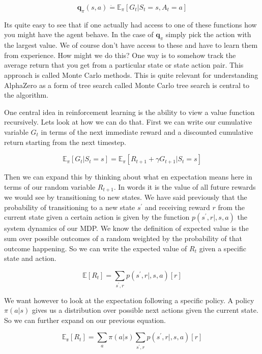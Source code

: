 \begin{equation}\label{Expected State Action Value}
\mathbf{q}_{\pi}(s,a) \dot{=} \mathbb{E}_{\pi}[G_{t} | S_{t} = s, A_{t} = a] 
\end{equation}

Its quite easy to see that if one actually had access to one of these functions how you might have the agent behave. In the case of $\mathbf{q}_{\pi}$ simply pick the action with the largest value. We of course don't have access to these and have to learn them from experience. How might we do this? One way is to somehow track the average return that you get from a particular state or state action pair. This approach is called Monte Carlo methods. This is quite relevant for understanding AlphaZero as a form of tree search called Monte Carlo tree search is central to the algorithm. 
    
One central idea in reinforcement learning is the ability to view a value function recursively. Lets look at how we can do that. First we can write our cumulative variable $G_{t}$ in terms of the next immediate reward and a discounted cumulative return starting from the next timestep.  

    $$ \mathbb{E}_{\pi}[G_{t} | S_{t} = s] = \mathbb{E}_{\pi}[R_{t + 1} + \gamma G_{t + 1} | S_{t} = s] $$
    
Then we can expand this by thinking about what en expectation means here in terms of our random variable $R_{t + 1}$. In words it is the value of all future rewards we would see by transitioning to new states. We have said previously that the probability of transitioning to a new state $s^{'}$ and receiving reward $r$ from the current state given a certain action is given by the function $p(s^{'},r|,s,a)$ the system dynamics of our MDP. We know the definition of expected value is the sum over possible outcomes of a random weighted by the probability of that outcome happening. So we can write the expected value of $R_{t}$ given a specific state and action. 

$$ \mathbb{E}[R_{t}] = \underset{s^{'},r}{\sum}p(s^{'},r|,s,a)[ r ]$$

We want however to look at the expectation following a specific policy. A policy $\pi(a|s)$ gives us a distribution over possible next actions given the current state. So we can further expand on our previous equation. 

$$ \mathbb{E_{\pi}}[R_{t}] = \underset{a}{\sum}\pi(a|s)\underset{s^{'},r}{\sum}p(s^{'},r|,s,a)[ r ]$$

